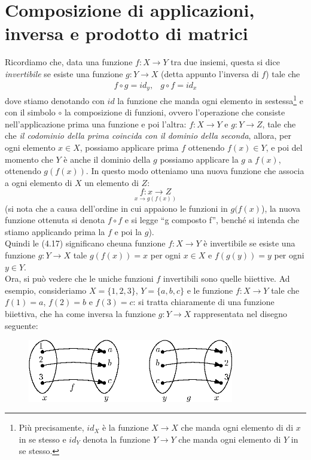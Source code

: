 \section{Composizione di applicazioni, inversa e prodotto di matrici}
\label{Composizione di applicazioni, inversa e prodotto di matrici}
Ricordiamo che, data una funzione $f:X\to Y$ tra due insiemi, questa si dice \textit{invertibile} se esiste una
funzione $g:Y\to X$ (detta appunto l'inversa di $f$) tale che
\begin{eqnarray}
  f\circ g=id_y, & g\circ f = id_x
\end{eqnarray}
dove stiamo denotando con $id$ la funzione che manda ogni elemento in sestessa\footnote{Più precisamente, $id_X$
  è la funzione $X\to X$ che manda ogni elemento di di $x$ in se stesso e $id_Y$ denota la funzione $Y\to Y$ che
  manda ogni elemento di $Y$ in se stesso.} e con il simbolo $\circ$ la composizione di funzioni, ovvero
l'operazione che consiste nell'applicazione prima una funzione e poi l'altra: $f:X\to Y$ e $g: Y\to Z$, tale che
che \textit{il codominio della prima coincida con il dominio della seconda}, allora, per ogni elemento $x\in X$,
possiamo applicare prima $f$ ottenendo $f(x)\in Y$, e poi del momento che $Y$ è anche il dominio della $g$
possiamo applicare la $g$ a $f(x)$, ottenendo $g(f(x))$. In questo modo otteniamo una nuova funzione che associa
a ogni elemento di $X$ un elemento di $Z$:
\begin{equation*}
  \underset{x\to g(f(x))}{f:x\to Z}
\end{equation*}
(si nota che a causa dell'ordine in cui appaiono le funzioni in $g(f(x)$), la nuova funzione ottenuta si denota
$f\circ f$ e si legge ``g composto f'', benché si intenda che stiamo applicando prima la $f$ e poi la $g$).\\
Quindi le (4.17) significano cheuna funzione $f:X\to Y$ è invertibile se esiste una funzione $g:Y\to X$ tale
$g(f(x))=x$ per ogni $x\in X$ e $f(g(y))=y$ per ogni $y\in Y$.\\
Ora, si può vedere che le uniche funzioni $f$ invertibili sono quelle biiettive. Ad esempio, consideriamo
$X=\{1,2,3\}$, $Y=\{a,b,c\}$ e le funzione $f:X\to Y$ tale che $f(1)=a$, $f(2)=b$ e $f(3)=c$: si tratta
chiaramente di una funzione biiettiva, che ha come inversa la funzione $g:Y\to X$ rappresentata nel disegno
seguente:
\begin{figure}[ht]
  \centering
  \includegraphics[width=9cm]{img/finiti/imgex4-5-1.eps}
\end{figure}

